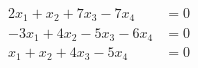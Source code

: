 \begin{align*}
2x_1  + x_2 + 7x_3 - 7x_4 &= 0 \\
-3x_1 + 4x_2 -5x_3 - 6x_4 &= 0 \\
x_1 +x_2 + 4x_3 - 5x_4 &=  0  
\end{align*}